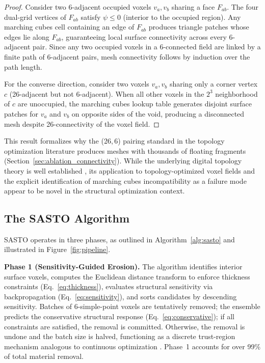 \documentclass[11pt]{article}
\theoremstyle{plain}
\theoremstyle{definition}
\theoremstyle{remark}
\begin{document}
\begin{proof}
Consider two 6-adjacent occupied voxels $v_a, v_b$ sharing a face $F_{ab}$. The four dual-grid vertices of $F_{ab}$ satisfy $\psi \leq 0$ (interior to the occupied region). Any marching cubes cell containing an edge of $F_{ab}$ produces triangle patches whose edges lie along $F_{ab}$, guaranteeing local surface connectivity across every 6-adjacent pair. Since any two occupied voxels in a 6-connected field are linked by a finite path of 6-adjacent pairs, mesh connectivity follows by induction over the path length.

For the converse direction, consider two voxels $v_a, v_b$ sharing only a corner vertex $c$ (26-adjacent but not 6-adjacent). When all other voxels in the $2^3$ neighborhood of $c$ are unoccupied, the marching cubes lookup table generates disjoint surface patches for $v_a$ and $v_b$ on opposite sides of the void, producing a disconnected mesh despite 26-connectivity of the voxel field.
\end{proof}

This result formalizes why the (26,\,6) pairing standard in the topology optimization literature produces meshes with thousands of floating fragments (Section~\ref{sec:ablation_connectivity}). While the underlying digital topology theory is well established \cite{kong1989}, its application to topology-optimized voxel fields and the explicit identification of marching cubes incompatibility as a failure mode appear to be novel in the structural optimization context.

\subsection{The SASTO Algorithm}
\label{sec:algorithm}

SASTO operates in three phases, as outlined in Algorithm~\ref{alg:sasto} and illustrated in Figure~\ref{fig:pipeline}.

\textbf{Phase 1 (Sensitivity-Guided Erosion).} The algorithm identifies interior surface voxels, computes the Euclidean distance transform to enforce thickness constraints (Eq.~\ref{eq:thickness}), evaluates structural sensitivity via backpropagation (Eq.~\ref{eq:sensitivity}), and sorts candidates by descending sensitivity. Batches of 6-simple-point voxels are tentatively removed; the ensemble predicts the conservative structural response (Eq.~\ref{eq:conservative}); if all constraints are satisfied, the removal is committed. Otherwise, the removal is undone and the batch size is halved, functioning as a discrete trust-region mechanism analogous to continuous optimization \cite{conn2000}. Phase~1 accounts for over 99\% of total material removal.
\end{document}
